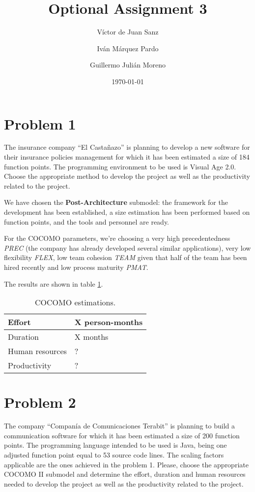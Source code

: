 \documentclass{article}
\title{Optional Assignment 3}
\date{\today}
\author{V\'ictor de Juan Sanz \and Iv\'an M\'arquez Pardo\and Guillermo Juli\'an Moreno}
\newcommand{\seprule}{{\color{gray} \noindent \hspace{40pt} \hrulefill \hspace{40pt} \vspace{13pt}}}
\begin{document}
\maketitle

\section{Problem 1}

The insurance company “El Casta\~nazo” is planning to develop a new software for their
insurance policies management for which it has been estimated a size of 184 function
points. The programming environment to be used is Visual Age 2.0. Choose the appropriate method to develop the project as well as the productivity related to the project.

\seprule

We have chosen the \textbf{Post-Architecture} submodel: the framework for the development has been established, a size estimation has been performed based on function points, and the tools and personnel are ready.

For the COCOMO parameters, we're choosing a very high precedentedness \textit{PREC} (the company has already developed several similar applications), very low flexibility \textit{FLEX}, low team cohesion \textit{TEAM} given that half of the team has been hired recently and low process maturity \textit{PMAT}.

The results are shown in table \ref{tblProblem1}.


\begin{table}[hbtp]
\centering
\begin{tabular}{l|l}
Effort & X person-months \\ \hline
Duration & X months \\ \hline
Human resources & ? \\ \hline
Productivity & ?
\end{tabular}
\caption{COCOMO estimations.}
\label{tblProblem1}
\end{table}

\section{Problem 2}

The company ``Compan\'ia de Comunicaciones Terabit'' is planning to build a communication software for which it has been estimated a size of 200 function points. The programming language intended to be used is Java, being one adjusted function point equal to 53 source code lines. The scaling factors applicable are the ones achieved in the problem 1. Please, choose the appropriate COCOMO II submodel and determine the effort, duration and human resources needed to develop the project as well as the productivity related to the project.
\end{document}
